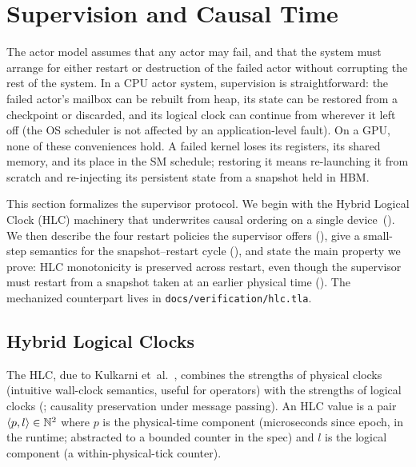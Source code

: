 \section{Supervision and Causal Time}
\label{sec:supervision}

The actor model assumes that any actor may fail, and that the system
must arrange for either restart or destruction of the failed actor
without corrupting the rest of the system.  In a CPU actor system,
supervision is straightforward: the failed actor's mailbox can be
rebuilt from heap, its state can be restored from a checkpoint or
discarded, and its logical clock can continue from wherever it
left off (the OS scheduler is not affected by an application-level
fault).  On a GPU, none of these conveniences hold.  A failed kernel
loses its registers, its shared memory, and its place in the SM
schedule; restoring it means re-launching it from scratch and
re-injecting its persistent state from a snapshot held in HBM.

This section formalizes the supervisor protocol.  We begin with the
Hybrid Logical Clock (HLC) machinery that underwrites causal
ordering on a single device~().  We then
describe the four restart policies the supervisor offers
(), give a small-step semantics for
the snapshot--restart cycle (), and
state the main property we prove: HLC monotonicity is preserved
across restart, even though the supervisor must restart from a
snapshot taken at an earlier physical time
().  The mechanized counterpart lives
in \texttt{docs/verification/hlc.tla}.

\subsection{Hybrid Logical Clocks}
\label{sec:supervision:hlc}

The HLC, due to Kulkarni et~al.~\citep{kulkarni2014hlc}, combines the
strengths of physical clocks (intuitive wall-clock semantics, useful
for operators) with the strengths of logical clocks
(\citet{lamport1978clocks}; causality preservation under message
passing).  An HLC value is a pair \(\langle p, l\rangle \in \mathbb{N}^2\)
where \(p\) is the physical-time component
(microseconds since epoch, in the runtime; abstracted to a bounded
counter in the spec) and \(l\) is the logical component (a
within-physical-tick counter).

